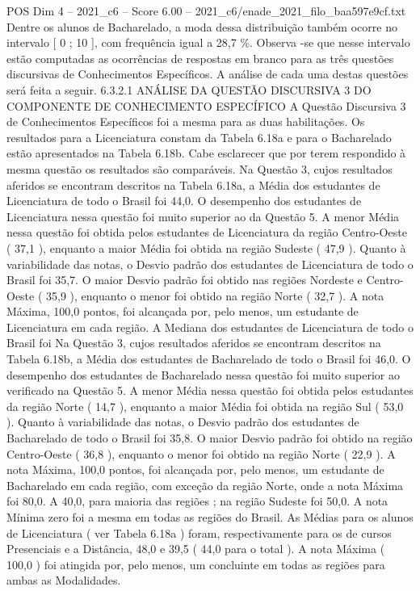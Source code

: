 \begin{textsample}{POS Dim 4 – 2021\_c6 – Score 6.00 – 2021\_c6/enade\_2021\_filo\_baa597e9cf.txt}
Dentre os alunos de Bacharelado, a moda dessa distribuição também ocorre no intervalo [ 0 ; 10 ], com frequência igual a 28,7 \%.
Observa -se que nesse intervalo estão computadas as ocorrências de respostas em branco para as três questões discursivas de Conhecimentos Específicos.
A análise de cada uma destas questões será feita a seguir. 6.3.2.1 ANÁLISE DA QUESTÃO DISCURSIVA 3 DO COMPONENTE DE CONHECIMENTO ESPECÍFICO A Questão Discursiva 3 de Conhecimentos Específicos foi a mesma para as duas habilitações.
Os resultados para a Licenciatura constam da Tabela 6.18a e para o Bacharelado estão apresentados na Tabela 6.18b.
Cabe esclarecer que por terem respondido à mesma questão os resultados são comparáveis.
Na Questão 3, cujos resultados aferidos se encontram descritos na Tabela 6.18a, a Média dos estudantes de Licenciatura de todo o Brasil foi 44,0.
O desempenho dos estudantes de Licenciatura nessa questão foi muito superior ao da Questão 5.
A menor Média nessa questão foi obtida pelos estudantes de Licenciatura da região Centro-Oeste ( 37,1 ), enquanto a maior Média foi obtida na região Sudeste ( 47,9 ).
Quanto à variabilidade das notas, o Desvio padrão dos estudantes de Licenciatura de todo o Brasil foi 35,7.
O maior Desvio padrão foi obtido nas regiões Nordeste e Centro-Oeste ( 35,9 ), enquanto o menor foi obtido na região Norte ( 32,7 ).
A nota Máxima, 100,0 pontos, foi alcançada por, pelo menos, um estudante de Licenciatura em cada região.
A Mediana dos estudantes de Licenciatura de todo o Brasil foi Na Questão 3, cujos resultados aferidos se encontram descritos na Tabela 6.18b, a Média dos estudantes de Bacharelado de todo o Brasil foi 46,0.
O desempenho dos estudantes de Bacharelado nessa questão foi muito superior ao verificado na Questão 5.
A menor Média nessa questão foi obtida pelos estudantes da região Norte ( 14,7 ), enquanto a maior Média foi obtida na região Sul ( 53,0 ).
Quanto à variabilidade das notas, o Desvio padrão dos estudantes de Bacharelado de todo o Brasil foi 35,8.
O maior Desvio padrão foi obtido na região Centro-Oeste ( 36,8 ), enquanto o menor foi obtido na região Norte ( 22,9 ).
A nota Máxima, 100,0 pontos, foi alcançada por, pelo menos, um estudante de Bacharelado em cada região, com exceção da região Norte, onde a nota Máxima foi 80,0.
A 40,0, para maioria das regiões ; na região Sudeste foi 50,0.
A nota Mínima zero foi a mesma em todas as regiões do Brasil.
As Médias para os alunos de Licenciatura ( ver Tabela 6.18a ) foram, respectivamente para os de cursos Presenciais e a Distância, 48,0 e 39,5 ( 44,0 para o total ).
A nota Máxima ( 100,0 ) foi atingida por, pelo menos, um concluinte em todas as regiões para ambas as Modalidades.

\end{textsample}
